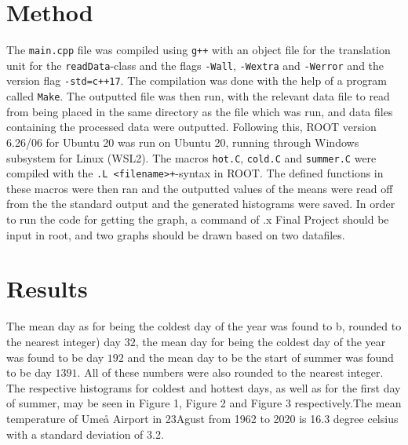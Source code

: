 \documentclass[a4, 12pt]{article}
\begin{document}
\section{Method}
The \texttt{main.cpp} file was compiled using \texttt{g++} with an object file for the translation unit for the \texttt{readData}-class and the flags \texttt{-Wall}, \texttt{-Wextra} and \texttt{-Werror} and the version flag \texttt{-std=c++17}. The compilation was done with the help of a program called \texttt{Make}. The outputted file was then run, with the relevant data file to read from being placed in the same directory as the file which was run, and data files containing the processed data were outputted. Following this, ROOT version 6.26/06 for Ubuntu 20 was run on Ubuntu 20, running through Windows subsystem for Linux (WSL2). The macros \texttt{hot.C}, \texttt{cold.C} and \texttt{summer.C} were compiled with the \texttt{.L <filename>+}-syntax in ROOT. The defined functions in these macros were then ran and the outputted values of the means were read off from the the standard output and the generated histograms were saved. In order to run the code for getting the graph, a command of .x Final Project should be input in root, and two graphs should be drawn based on two datafiles.




\section{Results}
The mean day as for being the coldest day of the year was found to b, rounded to the nearest integer) day $32$, the mean day for being the coldest day of the year was found to be day $192$ and the mean day to be the start of summer was found to be day $1391$. All of these numbers were also rounded to the nearest integer. The respective histograms for coldest and hottest days, as well as for the first day of summer, may be seen in Figure 1, Figure 2 and Figure 3 respectively.The mean temperature of Umeå Airport in 23Agust from 1962 to 2020 is 16.3 degree celsius with a standard deviation of 3.2.

\end{document}

